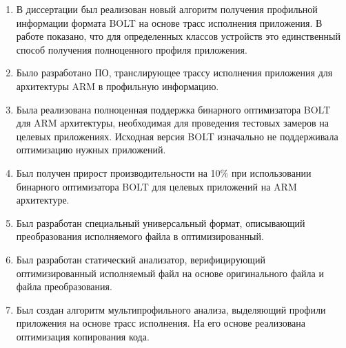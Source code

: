 \begin{enumerate}
  \item В диссертации был реализован новый алгоритм получения профильной информации формата BOLT на основе трасс исполнения приложения. В работе показано, что для определенных классов устройств это единственный способ получения полноценного профиля приложения.
  \item Было разработано ПО, транслирующее трассу исполнения приложения для архитектуры ARM в профильную информацию.
  \item Была реализована полноценная поддержка бинарного оптимизатора BOLT для ARM архитектуры, необходимая для проведения тестовых замеров на целевых приложениях. Исходная версия BOLT изначально не поддерживала оптимизацию нужных приложений.
  \item Был получен прирост производительности на 10\% при использовании бинарного оптимизатора BOLT для  целевых приложений на ARM архитектуре.
  \item Был разработан специальный универсальный формат, описывающий преобразования исполняемого файла в оптимизированный.
  \item Был разработан статический анализатор, верифицирующий оптимизированный исполняемый файл на основе оригинального файла и файла преобразования.
  \item Был создан алгоритм мультипрофильного анализа, выделяющий профили приложения на основе трасс исполнения. На его основе реализована оптимизация копирования кода.
\end{enumerate}
